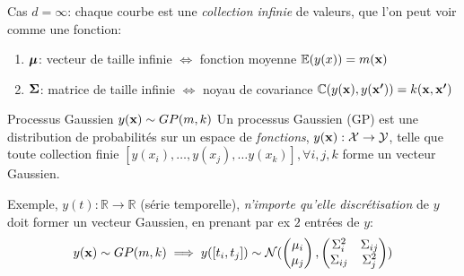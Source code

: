 \documentclass[xcolor=svgnames, t]{beamer}
\newcommand{\coloredemph}[1]{\textcolor{internationalblue}{\emph{#1}}}
\newcommand{\vectorx}[1]{\boldsymbol{\MakeLowercase{\mathbf{#1}}}}
\newcommand{\matrixx}[1]{\boldsymbol{\MakeUppercase{#1}}}
\begin{document}
\begin{frame}
  \frametitle{\secname}
  Cas $d=\infty$: chaque courbe est une \coloredemph{collection infinie} de valeurs, que l'on peut voir comme une fonction:
  \begin{enumerate}
    \item $\vectorx{\mu}$: vecteur de taille infinie $\Leftrightarrow$ fonction moyenne $\mathbb{E}(y(x)) = m(\vectorx{x})$
    \item $\matrixx{\Sigma}$: matrice de taille infinie $\Leftrightarrow$  noyau de covariance 
    $\mathbb{C}( y(\vectorx{x}), y(\vectorx{x^\prime}) ) = k(\vectorx{x}, \vectorx{x^{\prime}})$
  \end{enumerate}
  \pause
  \begin{block}{Processus Gaussien $y(\vectorx{x}) \sim GP(m, k)$}
    Un processus Gaussien (GP) est une distribution de probabilités sur un espace de \coloredemph{fonctions},
    $y(\vectorx{x}): \mathcal{X} \to \mathcal{Y}$, telle que toute collection finie
    $[ y(x_i), \dots, y(x_j), \dots y(x_k) ], \forall i,j,k$ forme un vecteur Gaussien. 
  \end{block}
  \pause
  Exemple, $y(t): \mathbb{R} \to \mathbb{R}$ (série temporelle), \coloredemph{n'importe qu'elle discrétisation} de $y$ doit
   former un vecteur Gaussien, en prenant par ex $2$ entrées de $y$:
  \begin{equation*}
    y(\vectorx{x}) \sim GP(m, k) \implies
    y([t_i, t_j]) \sim \mathcal{N} (
      \begin{pmatrix}
        \mu_i \\
        \mu_j 
      \end{pmatrix},
      \begin{pmatrix}
        \Sigma_{i}^2 & \Sigma_{ij} \\
        \Sigma_{ij} & \Sigma_{j}^2
      \end{pmatrix}
      )
  \end{equation*}
\end{frame}
\end{document}
